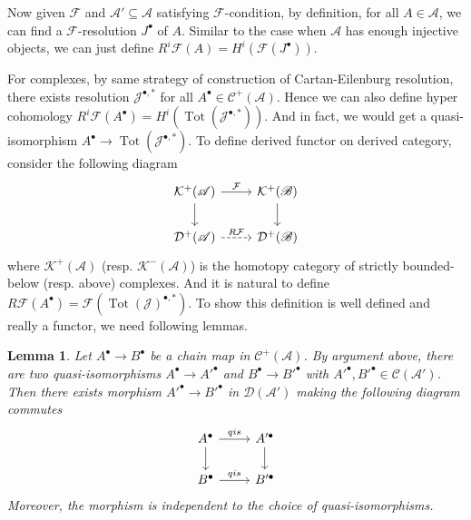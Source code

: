 \documentclass{ctexart}
\newtheorem{lemma}{Lemma}[section]
\newcommand{\totalcomplex}{\operatorname{Tot}}
\begin{document}
Now given $\mathcal{F}$ and $\mathscr{A}' \subseteq \mathscr{A}$ satisfying $\mathcal{F}$-condition,
by definition, for all $A\in \mathscr{A}$, we can find a $\mathcal{F}$-resolution $J^{\bullet}$ of $A$.
Similar to the case when $\mathscr{A}$ has enough injective objects, we can just define $R^{i}\mathcal{F}(A) = H^{i}(\mathcal{F}(J^{\bullet}))$.
\par
For complexes, by same strategy of construction of Cartan-Eilenburg resolution, there exists resolution $\mathcal{J}^{\bullet, \ast}$ for all $A^{\bullet}\in \mathcal{C}^{+}(\mathscr{A})$. 
Hence we can also define hyper cohomology $R^{i}\mathcal{F}(A^{\bullet}) = H^{i}(\totalcomplex (\mathcal{J}^{\bullet, \ast}))$.
And in fact, we would get a quasi-isomorphism $A^{\bullet} \rightarrow \totalcomplex (\mathcal{J}^{\bullet, \ast})$.
To define derived functor on derived category, consider the following diagram
\begin{equation}
    \begin{tikzcd}
        \mathcal{K}^{+}(\mathscr{A}) \arrow[r, "\mathcal{F}"] \arrow[d] &
        \mathcal{K}^{+}(\mathscr{B}) \arrow[d] \\
        \mathcal{D}^{+}(\mathscr{A}) \arrow[r, dashrightarrow, "R\mathcal{F}"] &
        \mathcal{D}^{+}(\mathscr{B})
    \end{tikzcd}
\end{equation}
where $\mathcal{K}^{+}(\mathscr{A})$ (resp. $\mathcal{K}^{-}(\mathscr{A})$) is the homotopy category of strictly bounded-below (resp. above) complexes.
And it is natural to define $R\mathcal{F}(A^{\bullet}) = \mathcal{F}(\totalcomplex (\mathcal{J})^{\bullet, \ast})$.
To show this definition is well defined and really a functor, we need following lemmas. 
\begin{lemma}
    Let $A^{\bullet} \rightarrow B^{\bullet}$ be a chain map in $\mathcal{C}^{+}(\mathscr{A})$.
    By argument above, there are two quasi-isomorphisms $A^{\bullet} \rightarrow A'^{\bullet}$ and $B^{\bullet} \rightarrow B'^{\bullet}$ with $A'^{\bullet},B'^{\bullet}\in \mathcal{C}(\mathscr{A}')$.
    Then there exists morphism $A'^{\bullet} \rightarrow B'^{\bullet}$ in $\mathcal{D}(\mathscr{A}')$ making the following diagram commutes
    \begin{equation}
        \begin{tikzcd}
            A^{\bullet} \arrow[r, "qis"] \arrow[d] &
            A'^{\bullet} \arrow[d] \\
            B^{\bullet} \arrow[r, "qis"] &
            B'^{\bullet}
        \end{tikzcd}
    \end{equation}
    Moreover, the morphism is independent to the choice of quasi-isomorphisms.
    \label{Lemma 6.9}
\end{lemma}
\end{document}
